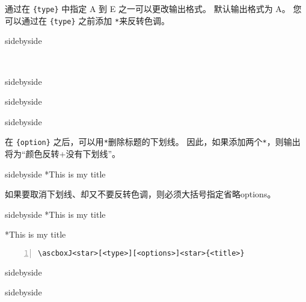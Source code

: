 \documentclass[a4]{ctexart}
\begin{document}
通过在 \verb|{type}| 中指定 A 到 E 之一可以更改输出格式。 默认输出格式为 A。 您可以通过在 \verb|{type}| 之前添加 \verb|*|来反转色调。
\begin{tcblisting}{sidebyside}
    
\end{tcblisting}

\
\begin{tcblisting}{sidebyside}
    
\end{tcblisting}
\begin{tcblisting}{sidebyside}
    
\end{tcblisting}
\begin{tcblisting}{sidebyside}
    
\end{tcblisting}


在 \verb|{option}| 之后，可以用\verb|*|删除标题的下划线。 因此，如果添加两个\verb|*|，则输出将为“颜色反转+没有下划线”。

\begin{tcblisting}{sidebyside}
    \ascboxB**{This is my title} 
\end{tcblisting}

如果要取消下划线、却又不要反转色调，则必须大括号指定省略options。
\begin{tcblisting}{sidebyside}
    \ascboxB[A][]*{This is my title}
    
    \ascboxB*[C][]*{This is my title}
\end{tcblisting}


\begin{lstlisting}[backgroundcolor=\color{gray!5},framerule=1pt,frame=tb,numbers=left,
    numberstyle=\tiny\color{black},]
\ascboxJ<star>[<type>][<options>]<star>{<title>}
\end{lstlisting}


\begin{tcblisting}{sidebyside}
    
\end{tcblisting}

\begin{tcblisting}{sidebyside}
    
\end{tcblisting}
\end{document}
